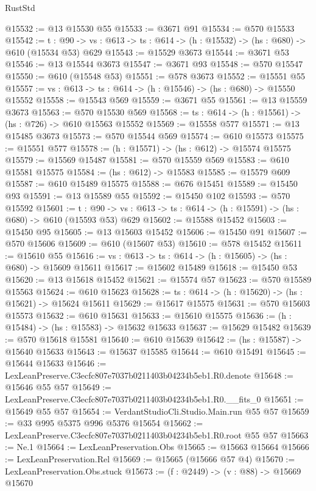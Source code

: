 \begin{lexlean}{RustStd}
\begin{coremodule}
@15532 := @13 @15530 @55
@15533 := @3671 @91
@15534 := @570 @15533
@15542 := {t : @90} ->
  {vs : @613} -> {ts : @614} -> (h : @15532) -> (hs : @680) -> @610 (@15534 @53) @629
@15543 := @15529 @3673
@15544 := @3671 @53
@15546 := @13 @15544 @3673
@15547 := @3671 @93
@15548 := @570 @15547
@15550 := @610 (@15548 @53)
@15551 := @578 @3673
@15552 := @15551 @55
@15557 := {vs : @613} -> {ts : @614} -> (h : @15546) -> (hs : @680) -> @15550 @15552
@15558 := @15543 @569
@15559 := @3671 @55
@15561 := @13 @15559 @3673
@15563 := @570 @15530 @569
@15568 := {ts : @614} -> (h : @15561) -> (hs : @726) -> @610 @15563 @15552
@15569 := @15558 @577
@15571 := @13 @15485 @3673
@15573 := @570 @15544 @569
@15574 := @610 @15573
@15575 := @15551 @577
@15578 := (h : @15571) -> (hs : @612) -> @15574 @15575
@15579 := @15569 @15487
@15581 := @570 @15559 @569
@15583 := @610 @15581 @15575
@15584 := (hs : @612) -> @15583
@15585 := @15579 @609
@15587 := @610 @15489 @15575
@15588 := @676 @15451
@15589 := @15450 @93
@15591 := @13 @15589 @55
@15592 := @15450 @102
@15593 := @570 @15592
@15601 := {t : @90} ->
  {vs : @613} -> {ts : @614} -> (h : @15591) -> (hs : @680) -> @610 (@15593 @53) @629
@15602 := @15588 @15452
@15603 := @15450 @95
@15605 := @13 @15603 @15452
@15606 := @15450 @91
@15607 := @570 @15606
@15609 := @610 (@15607 @53)
@15610 := @578 @15452
@15611 := @15610 @55
@15616 := {vs : @613} -> {ts : @614} -> (h : @15605) -> (hs : @680) -> @15609 @15611
@15617 := @15602 @15489
@15618 := @15450 @53
@15620 := @13 @15618 @15452
@15621 := @15574 @57
@15623 := @570 @15589 @15563
@15624 := @610 @15623
@15628 := {ts : @614} -> (h : @15620) -> (hs : @15621) -> @15624 @15611
@15629 := @15617 @15575
@15631 := @570 @15603 @15573
@15632 := @610 @15631
@15633 := @15610 @15575
@15636 := (h : @15484) -> (hs : @15583) -> @15632 @15633
@15637 := @15629 @15482
@15639 := @570 @15618 @15581
@15640 := @610 @15639
@15642 := (hs : @15587) -> @15640 @15633
@15643 := @15637 @15585
@15644 := @610 @15491
@15645 := @15644 @15633
@15646 := LexLeanPreserve.C3ecfc807e7037b0211403b04234b5eb1.R0.denote
@15648 := @15646 @55 @57
@15649 := LexLeanPreserve.C3ecfc807e7037b0211403b04234b5eb1.R0.__fits_0
@15651 := @15649 @55 @57
@15654 := VerdantStudioCli.Studio.Main.run @55 @57
@15659 := @33 @995 @5375 @996 @5376 @15654
@15662 := LexLeanPreserve.C3ecfc807e7037b0211403b04234b5eb1.R0.root @55 @57
@15663 := Ne.{1}
@15664 := LexLeanPreservation.Obs
@15665 := @15663 @15664
@15666 := LexLeanPreservation.Rel
@15669 := @15665 (@15666 @57 @4)
@15670 := LexLeanPreservation.Obs.stuck
@15673 := (f : @2449) -> (v : @88) -> @15669 @15670

\end{coremodule}
\end{lexlean}

